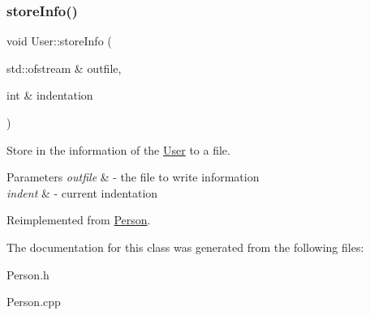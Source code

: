 \subsubsection{\texorpdfstring{store\+Info()}{storeInfo()}}
{\footnotesize\ttfamily void User\+::store\+Info (\begin{DoxyParamCaption}\item[{std\+::ofstream \&}]{outfile,  }\item[{int \&}]{indentation }\end{DoxyParamCaption})\hspace{0.3cm}{\ttfamily [virtual]}}



Store in the information of the \mbox{\hyperlink{class_user}{User}} to a file. 


\begin{DoxyParams}{Parameters}
{\em outfile} & -\/ the file to write information \\
\hline
{\em indent} & -\/ current indentation \\
\hline
\end{DoxyParams}


Reimplemented from \mbox{\hyperlink{class_person_a80f87df3f644706c2ad8fc8b800fdd95}{Person}}.



The documentation for this class was generated from the following files\+:\begin{DoxyCompactItemize}
\item 
Person.\+h\item 
Person.\+cpp\end{DoxyCompactItemize}
